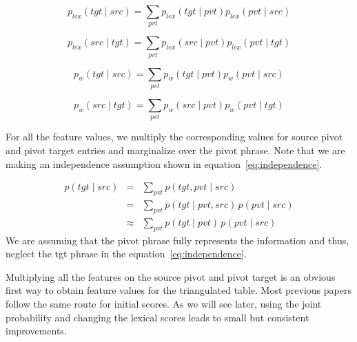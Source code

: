  		\begin{equation} \label{eq:first}
                 p_{lex}(tgt \mid src) = \sum_{pvt} p_{lex}(tgt \mid pvt) p_{lex}(pvt \mid src)
        \end{equation}

        \begin{equation}
        	p_{lex}(src \mid tgt) = \sum_{pvt} p_{lex}(src \mid pvt) p_{lex}(pvt \mid tgt)
        \end{equation}

         \begin{equation}
        	p_w(tgt \mid src) = \sum_{pvt} p_w(tgt \mid pvt) p_w(pvt \mid src)
        \end{equation}

        \begin{equation} \label{eq:last}
        	p_w(src \mid tgt) = \sum_{pvt} p_w(src \mid pvt) p_w(pvt \mid tgt)
        \end{equation}

        For all the feature values, we multiply the corresponding values for source pivot and pivot target entries and marginalize over the pivot phrase. Note that we are making an independence assumption shown in equation~\eqref{eq:independence}. 

         \begin{eqnarray*} \label{eq:independence}
                p(tgt \mid src)&=&\sum_{pvt}{p(tgt, pvt \mid src)}\\
                &=& \sum_{pvt}{p(tgt \mid pvt, src)\,p(pvt \mid src)}\\
                &\approx& \sum_{pvt}{p(tgt \mid pvt)\,p(pvt \mid src)}
        \end{eqnarray*}
        We are assuming that the pivot phrase fully represents the information and thus, neglect the tgt phrase in the equation~\eqref{eq:independence}.


        Multiplying all the features on the source pivot and pivot target is an obvious first way to obtain feature values for the triangulated table. Most previous papers follow the same route for initial scores. As we will see later, using the joint probability and changing the lexical scores leads to small but consistent improvements. 



\newcommand{\maninexample}[1]{\emph{$\grave{a}$ $l\acute{a}$ $b\acute{a}\acute{a}r\acute{a}$ \textipa{\textltailn}$\acute{u}m\acute{a}$ $k\acute{o}s\acute{ɔ}n$}}

